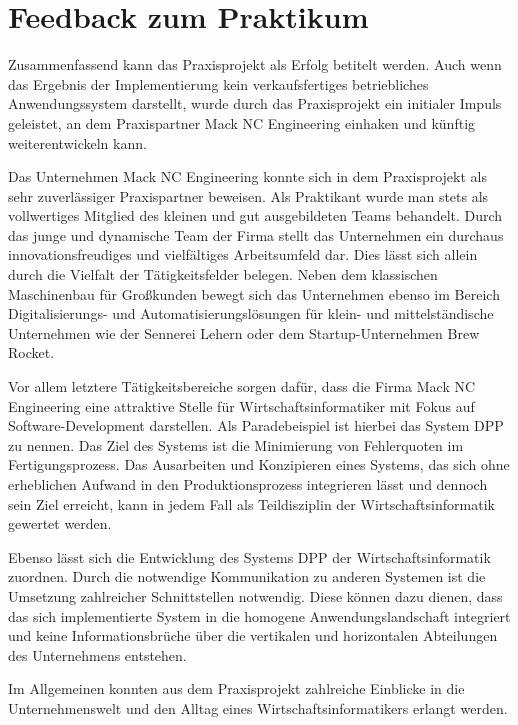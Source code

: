 \documentclass[
    type=Prakikumsbericht,
    status=draft, %
    language=german, %
    bibengine=bibtex,
]{unibwm-inf-thesis}
\begin{document}
    \chapter{Feedback zum Praktikum}
    Zusammenfassend kann das Praxisprojekt als Erfolg betitelt werden.
    Auch wenn das Ergebnis der Implementierung kein verkaufsfertiges betriebliches Anwendungssystem darstellt, wurde durch das Praxisprojekt ein
    initialer Impuls geleistet, an dem Praxispartner Mack NC Engineering einhaken und künftig weiterentwickeln kann.

    Das Unternehmen Mack NC Engineering konnte sich in dem Praxisprojekt als sehr zuverlässiger Praxispartner beweisen.
    Als Praktikant wurde man stets als vollwertiges Mitglied des kleinen und gut ausgebildeten Teams behandelt.
    Durch das junge und dynamische Team der Firma stellt das Unternehmen ein durchaus innovationsfreudiges und vielfältiges Arbeitsumfeld dar.
    Dies lässt sich allein durch die Vielfalt der Tätigkeitsfelder belegen.
    Neben dem klassischen Maschinenbau für Großkunden bewegt sich das Unternehmen ebenso im Bereich Digitalisierungs- und Automatisierungslösungen für klein- und mittelständische
    Unternehmen wie der Sennerei Lehern oder dem Startup-Unternehmen Brew Rocket.

    Vor allem letztere Tätigkeitsbereiche sorgen dafür, dass die Firma Mack NC Engineering eine attraktive Stelle für Wirtschaftsinformatiker mit Fokus auf Software-Development darstellen.
    Als Paradebeispiel ist hierbei das System \ac{DPP} zu nennen.
    Das Ziel des Systems ist die Minimierung von Fehlerquoten im Fertigungsprozess.
    Das Ausarbeiten und Konzipieren eines Systems, das sich ohne erheblichen Aufwand in den Produktionsprozess integrieren lässt und dennoch sein Ziel erreicht, kann in jedem Fall als Teildisziplin der Wirtschaftsinformatik gewertet werden.

    Ebenso lässt sich die Entwicklung des Systems \ac{DPP} der Wirtschaftsinformatik zuordnen.
    Durch die notwendige Kommunikation zu anderen Systemen ist die Umsetzung zahlreicher Schnittstellen notwendig.
    Diese können dazu dienen, dass das sich implementierte System in die homogene Anwendungslandschaft integriert und keine Informationsbrüche über die vertikalen und horizontalen Abteilungen des Unternehmens entstehen.

    Im Allgemeinen konnten aus dem Praxisprojekt zahlreiche Einblicke in die Unternehmenswelt und den Alltag eines Wirtschaftsinformatikers erlangt werden.

    
    
\end{document}
